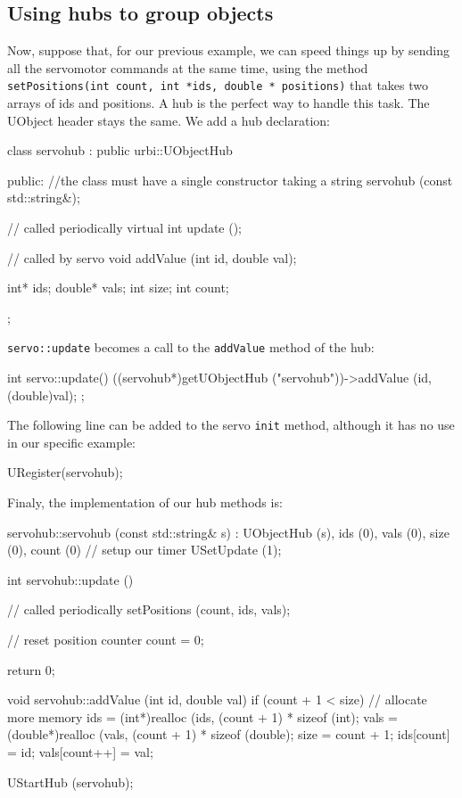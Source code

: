 \subsection{Using hubs to group objects}

Now, suppose that, for our previous example, we can speed things up by
sending all the servomotor commands at the same time, using the method
\lstinline{setPositions(int count, int *ids, double * positions)} that
takes two arrays of ids and positions. A hub is the perfect way to
handle this task. The UObject header stays the same. We add a hub
declaration:

\begin{urbiscript}
class servohub : public urbi::UObjectHub
{
public:
  //the class must have a single constructor taking a string
  servohub (const std::string&);

  // called periodically
  virtual int update ();

  // called by servo
  void addValue (int id, double val);

  int* ids;
  double* vals;
  int size;
  int count;
};
\end{urbiscript}

\lstinline{servo::update} becomes a call to the \lstinline{addValue}
method of the hub:

\begin{urbiscript}
int
servo::update()
{
  ((servohub*)getUObjectHub ("servohub"))->addValue (id, (double)val);
};
\end{urbiscript}

The following line can be added to the servo \lstinline{init} method,
although it has no use in our specific example:

\begin{urbiscript}
URegister(servohub);
\end{urbiscript}

Finaly, the implementation of our hub methods is:

\begin{urbiscript}
servohub::servohub (const std::string& s)
  : UObjectHub (s),
    ids   (0),
    vals  (0),
    size  (0),
    count (0)
{
  // setup our timer
  USetUpdate (1);
}

int
servohub::update ()
{
  // called periodically
  setPositions (count, ids, vals);

  // reset position counter
  count = 0;

  return 0;
}

void
servohub::addValue (int id, double val)
{
  if (count + 1 < size)
  {
    // allocate more memory
    ids = (int*)realloc (ids, (count + 1) * sizeof (int);
    vals = (double*)realloc (vals, (count + 1) * sizeof (double);
    size = count + 1;
  }
  ids[count] = id;
  vals[count++] = val;
}

UStartHub (servohub);
\end{urbiscript}

